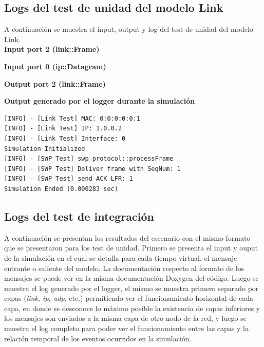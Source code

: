 \documentclass[10pt,a4paper]{article}
\begin{document}
\newpage

\subsection{Logs del test de unidad del modelo Link}
\label{appendix: link unit test}
A continuación se muestra el input, output y log del test de unidad del modelo Link.\\

\textbf{Input port 2 (link::Frame)}


\textbf{Input port 0 (ip::Datagram)}


\textbf{Output port 2 (link::Frame)}


\textbf{Output generado por el logger durante la simulación}
\begin{lstlisting}
[INFO] - [Link Test] MAC: 0:0:0:0:0:1
[INFO] - [Link Test] IP: 1.0.0.2
[INFO] - [Link Test] Interface: 0
Simulation Initialized
[INFO] - [SWP Test] swp_protocol::processFrame
[INFO] - [SWP Test] Deliver frame with SeqNum: 1
[INFO] - [SWP Test] send ACK LFR: 1
Simulation Ended (0.000283 sec)
\end{lstlisting}

\newpage

\subsection{Logs del test de integración}
\label{appendix: integration test}

A continuación se presentan los resultados del escenario con el mismo formato que se presentaron para los test de unidad. Primero se presenta el input y ouput de la simulación en el cual se detalla para cada tiempo virtual, el mensaje entrante o saliente del modelo. La documentación respecto al formato de los mensajes se puede ver en la misma documentación Doxygen del código. Luego se muestra el log generado por el logger, el mismo se muestra primero separado por capas (\textit{link, ip, udp}, etc.) permitiendo ver el funcionamiento horizontal de cada capa, en donde se desconoce lo máximo posible la existencia de capas inferiores y los mensajes son enviados a la misma capa de otro nodo de la red, y luego se muestra el log completo para poder ver el funcionamiento entre las capas y la relación temporal de los eventos ocurridos en la simulación. \\
\end{document}
